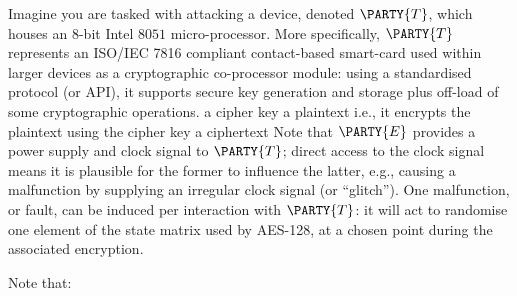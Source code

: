 %



Imagine you are tasked with attacking a device, denoted 
$\PARTY{T}$, 
which houses an $8$-bit Intel $8051$ micro-processor.  More specifically,
$\PARTY{T}$ 
represents an ISO/IEC 7816 compliant contact-based smart-card used within 
larger devices as a cryptographic co-processor module: 
using a standardised protocol (or API), it supports secure key generation 
and storage plus off-load of some cryptographic operations.
\DESCINTRO[fault]
{}
{a cipher key}
{a  plaintext}
{i.e., it encrypts the plaintext using the cipher key}
{a ciphertext}
Note that
$\PARTY{E}$ 
provides a power supply and clock signal to 
$\PARTY{T}$;
direct access to the 
clock signal
means it is plausible 
for the former to influence the latter, e.g., causing a malfunction by supplying an irregular clock signal (or ``glitch'').
One malfunction, or fault, can be induced per interaction with 
$\PARTY{T}$: 
it will act to randomise one element of the state matrix used by AES-128, 
at a chosen point during the associated encryption.




%
Note that:

